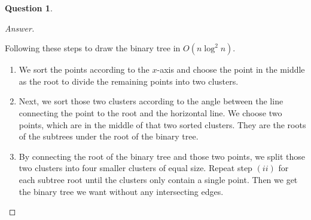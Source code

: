 \documentclass{article}
\theoremstyle{plain}
\newtheorem{question}{Question}
\newenvironment{answer}[1][Answer]
    {\begin{proof}[#1]{$ $}\renewcommand\qedsymbol{$\vartriangle$}}
    {\end{proof}}
\begin{document}
\begin{question}
\end{question}
\begin{answer}
    \begin{enumerate}
        Following these steps to draw the binary tree in $O(n\log^2 n)$.
        \begin{enumerate}
            \item
            We sort the points according to the $x$-axis and choose the point in the middle as the root to divide the remaining points into two clusters.
            \item
            Next, we sort those two clusters according to the angle between the line connecting the point to the root and the horizontal line. We choose two points, which are in the middle of that two sorted clusters. They are the roots of the subtrees under the root of the binary tree.
            \item
            By connecting the root of the binary tree and those two points, we split those two clusters into four smaller clusters of equal size. Repeat step $(ii)$ for each subtree root until the clusters only contain a single point. Then we get the binary tree we want without any intersecting edges.
        \end{enumerate}

    \end{enumerate}
\end{answer}
\end{document}

